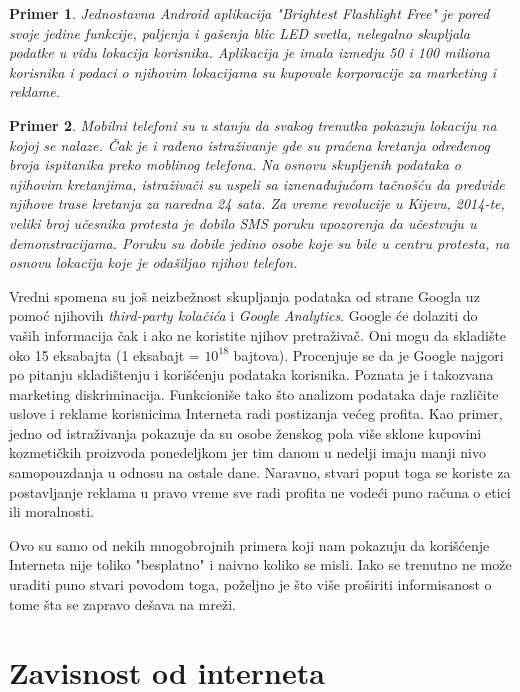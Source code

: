 \documentclass[a4paper]{article}
\newtheorem{primer}{Primer}[section]
\begin{document}
\begin{primer}
	Jednostavna Android aplikacija "Brightest Flashlight 
Free" je pored svoje jedine funkcije, paljenja i gašenja blic LED svetla, nelegalno skupljala podatke u vidu lokacija korisnika. Aplikacija je imala izmedju 50 i 100 miliona korisnika i podaci o njihovim lokacijama su kupovale korporacije za marketing i reklame.\cite{dataAndGoliath}\cite{flashlightApp}\\
\end{primer}

\begin{primer}
	Mobilni telefoni su u stanju da svakog trenutka pokazuju lokaciju na kojoj se nalaze. Čak je i rađeno istraživanje gde su praćena kretanja određenog broja ispitanika preko moblinog telefona. Na osnovu skupljenih podataka o njihovim kretanjima, istraživači su uspeli sa iznenađujućom tačnošću da predvide njihove trase kretanja za naredna 24 sata. Za vreme revolucije u Kijevu, 2014-te, veliki broj učesnika protesta je dobilo SMS poruku upozorenja da učestvuju u demonstracijama. Poruku su dobile jedino osobe koje su bile u centru protesta, na osnovu lokacija koje je odašiljao njihov telefon. \cite{dataAndGoliath}
\end{primer}

	Vredni spomena su još neizbežnost skupljanja podataka od strane Googla uz pomoć njihovih \textit{third-party kolačića} i \textit{Google Analytics}. Google će dolaziti do vaših informacija čak i ako ne koristite njihov pretraživač. Oni mogu da skladište oko 15 eksabajta (1 eksabajt = $10^{18}$ bajtova). Procenjuje se da je Google najgori po pitanju skladištenju i korišćenju podataka korisnika. Poznata je i takozvana marketing diskriminacija. Funkcioniše tako što analizom podataka daje različite uslove i reklame korisnicima Interneta radi postizanja većeg profita. Kao primer, jedno od istraživanja pokazuje da su osobe ženskog pola više sklone kupovini kozmetičkih proizvoda ponedeljkom jer tim danom u nedelji imaju manji nivo samopouzdanja u odnosu na ostale dane. Naravno, stvari poput toga se koriste za postavljanje reklama u pravo vreme sve radi profita ne vodeći puno računa o etici ili moralnosti. \cite{dataAndGoliath} \cite{theNetDelusion}

	Ovo su samo od nekih mnogobrojnih primera koji nam pokazuju da korišćenje Interneta nije toliko "besplatno" i naivno koliko se misli. Iako se trenutno ne može uraditi puno stvari povodom toga, poželjno je što više proširiti informisanost o tome šta se zapravo dešava na mreži.
	
\section{Zavisnost od interneta}

\appendix
 

\appendix
\end{document}
